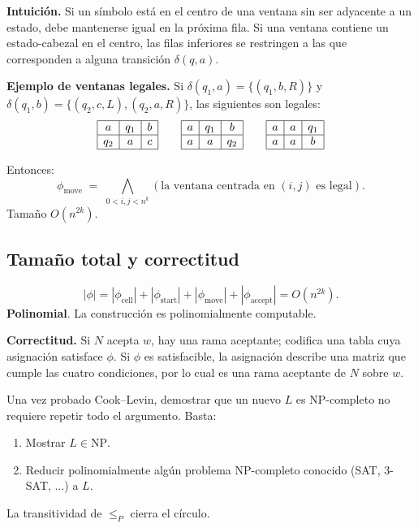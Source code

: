 \documentclass[11pt,a4paper]{article}
\theoremstyle{definicion}
\newcommand{\redP}{\leq_{P}}
\newcommand{\NP}{\mathrm{NP}}
\begin{document}
\textbf{Intuici\'on.} Si un s\'imbolo est\'a en el centro de una ventana sin ser adyacente a un estado, debe mantenerse igual en la pr\'oxima fila. Si una ventana contiene un estado-cabezal en el centro, las filas inferiores se restringen a las que corresponden a alguna transici\'on $\delta(q, a)$.

\textbf{Ejemplo de ventanas legales.} Si $\delta(q_1, a) = \{(q_1, b, R)\}$ y $\delta(q_1, b) = \{(q_2, c, L), (q_2, a, R)\}$, las siguientes son legales:
\[
\begin{array}{|c|c|c|}\hline a & q_1 & b \\ \hline q_2 & a & c \\ \hline\end{array} \qquad
\begin{array}{|c|c|c|}\hline a & q_1 & b \\ \hline a & a & q_2 \\ \hline\end{array} \qquad
\begin{array}{|c|c|c|}\hline a & a & q_1 \\ \hline a & a & b \\ \hline\end{array}
\]

Entonces:
\[
\phi_{\text{move}} \;=\; \bigwedge_{0 < i, j < n^k} (\text{la ventana centrada en } (i, j) \text{ es legal}).
\]
Tama\~no $O(n^{2k})$.

\subsection{Tama\~no total y correctitud}

\[
|\phi| = |\phi_{\text{cell}}| + |\phi_{\text{start}}| + |\phi_{\text{move}}| + |\phi_{\text{accept}}| = O(n^{2k}).
\]
\textbf{Polinomial}. La construcci\'on es polinomialmente computable.

\textbf{Correctitud.} Si $N$ acepta $w$, hay una rama aceptante; codifica una tabla cuya asignaci\'on satisface $\phi$. Si $\phi$ es satisfacible, la asignaci\'on describe una matriz que cumple las cuatro condiciones, por lo cual es una rama aceptante de $N$ sobre $w$.

\begin{idea}
Una vez probado Cook--Levin, demostrar que un nuevo $L$ es NP-completo no requiere repetir todo el argumento. Basta:
\begin{enumerate}
    \item Mostrar $L \in \NP$.
    \item Reducir polinomialmente alg\'un problema NP-completo conocido (SAT, 3-SAT, $\dots$) a $L$.
\end{enumerate}
La transitividad de $\redP$ cierra el c\'irculo.
\end{idea}
\end{document}
